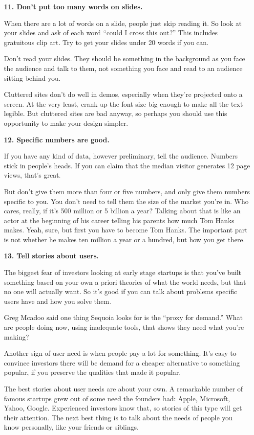 \documentclass[12pt]{book}
\begin{document}
\textbf{11. Don't put too many words on slides.}

When there are a lot of words on a slide, people just skip reading it.
So look at your slides and ask of each word ``could I cross this out?''
This includes gratuitous clip art. Try to get your slides under 20 words
if you can.

Don't read your slides. They should be something in the background as
you face the audience and talk to them, not something you face and read
to an audience sitting behind you.

Cluttered sites don't do well in demos, especially when they're
projected onto a screen. At the very least, crank up the font size big
enough to make all the text legible. But cluttered sites are bad anyway,
so perhaps you should use this opportunity to make your design simpler.

\textbf{12. Specific numbers are good.}

If you have any kind of data, however preliminary, tell the audience.
Numbers stick in people's heads. If you can claim that the median
visitor generates 12 page views, that's great.

But don't give them more than four or five numbers, and only give them
numbers specific to you. You don't need to tell them the size of the
market you're in. Who cares, really, if it's 500 million or 5 billion a
year? Talking about that is like an actor at the beginning of his career
telling his parents how much Tom Hanks makes. Yeah, sure, but first you
have to become Tom Hanks. The important part is not whether he makes ten
million a year or a hundred, but how you get there.

\textbf{13. Tell stories about users.}

The biggest fear of investors looking at early stage startups is that
you've built something based on your own a priori theories of what the
world needs, but that no one will actually want. So it's good if you can
talk about problems specific users have and how you solve them.

Greg Mcadoo said one thing Sequoia looks for is the ``proxy for
demand.'' What are people doing now, using inadequate tools, that shows
they need what you're making?

Another sign of user need is when people pay a lot for something. It's
easy to convince investors there will be demand for a cheaper
alternative to something popular, if you preserve the qualities that
made it popular.

The best stories about user needs are about your own. A remarkable
number of famous startups grew out of some need the founders had: Apple,
Microsoft, Yahoo, Google. Experienced investors know that, so stories of
this type will get their attention. The next best thing is to talk about
the needs of people you know personally, like your friends or siblings.
\end{document}
